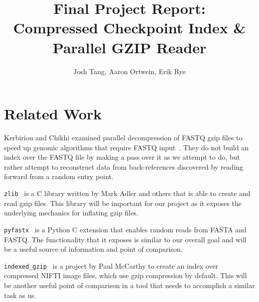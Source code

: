 \documentclass[10pt]{article}
\title{Final Project Report:\\ Compressed Checkpoint Index \& Parallel GZIP
Reader}
\author{Josh Tang, Aaron Ortwein, Erik Rye}
\begin{document}
\maketitle

\section{Related Work}

Kerbiriou and Chikhi examined parallel decompression of FASTQ gzip files to
speed up genomic algorithms that require FASTQ
input~\cite{kerbiriou2019parallel}. They do not build an index over the FASTQ
file by making a pass over it as we attempt to do, but rather attempt to
reconstruct data from back-references discovered by reading forward from a
random entry point.

\texttt{zlib}~\cite{zlib} is a C library written by Mark Adler and others that
is able to create and read gzip files. This library will be important for our
project as it exposes the underlying mechanics for inflating gzip files.

\texttt{pyfastx}~\cite{pyfastx} is a Python C extension that enables random
reads from FASTA and FASTQ. The functionality that it exposes is similar to our
overall goal and will be a useful source of information and point of comparison.

\texttt{indexed\_gzip}~\cite{indexedgzip} is a project by Paul McCarthy to
create an index over compressed NIFTI image files, which use gzip compression by
default. This will be another useful point of comparison in a tool that needs to
accomplish a similar task as us.
\end{document}
